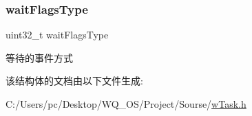 \subsubsection{\texorpdfstring{wait\+Flags\+Type}{waitFlagsType}}
{\footnotesize\ttfamily uint32\+\_\+t wait\+Flags\+Type}

等待的事件方式 

该结构体的文档由以下文件生成\+:\begin{DoxyCompactItemize}
\item 
C\+:/\+Users/pc/\+Desktop/\+W\+Q\+\_\+\+O\+S/\+Project/\+Sourse/\mbox{\hyperlink{w_task_8h}{w\+Task.\+h}}\end{DoxyCompactItemize}

